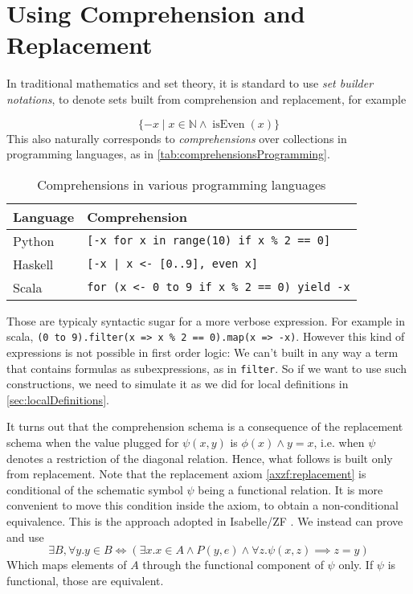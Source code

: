 \section{Using Comprehension and Replacement}

In traditional mathematics and set theory, it is standard to use \textit{set builder notations}, to denote sets built from comprehension and replacement, for example

$$\lbrace -x \mid x\in \mathbb N \land \operatorname{isEven}(x) \rbrace$$
This also naturally corresponds to \textit{comprehensions} over collections in programming languages, as in \autoref{tab:comprehensionsProgramming}.
\begin{table}[h]
  \begin{tabular}{l|l}
    \textbf{Language} & \textbf{Comprehension} \\ \hline
    Python            & \lstinline$[-x for x in range(10) if x % 2 == 0]$ \\
    Haskell           & \lstinline$[-x | x <- [0..9], even x]$ \\
    Scala             & \lstinline$for (x <- 0 to 9 if x % 2 == 0) yield -x$ \\
  \end{tabular}
  \caption{Comprehensions in various programming languages}
  \label{tab:comprehensionsProgramming}
\end{table}
Those are typicaly syntactic sugar for a more verbose expression. For example in scala, \lstinline|(0 to 9).filter(x => x % 2 == 0).map(x => -x)|. However this kind of expressions is not possible in first order logic: We can't built in any way a term that contains formulas as subexpressions, as in \lstinline|filter|. So if we want to use such constructions, we need to simulate it as we did for local definitions in \autoref{sec:localDefinitions}.

It turns out that the comprehension schema is a consequence of the replacement schema when the value plugged for $\psi(x, y)$ is $\phi(x) \land y = x$, i.e. when $\psi$ denotes a restriction of the diagonal relation. Hence, what follows is built only from replacement.
Note that the replacement axiom \autoref{axzf:replacement} is conditional of the schematic symbol $\psi$ being a functional relation. It is more convenient to move this condition inside the axiom, to obtain a non-conditional equivalence. This is the approach adopted in Isabelle/ZF \cite{noelExperimentingIsabelleZF1993}. We instead can prove and use
$$ \exists B, \forall y. y \in B \iff (\exists x. x \in A \land P(y, e) \land ∀ z. \psi(x, z) \implies z = y) $$
Which maps elements of $A$ through the functional component of $\psi$ only. If $\psi$ is functional, those are equivalent.

